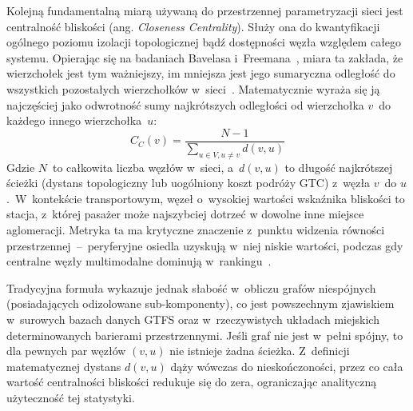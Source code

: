 \documentclass{pracamgr}
\begin{document}
Kolejną fundamentalną miarą używaną do przestrzennej parametryzacji sieci jest centralność bliskości (ang. \textit{Closeness Centrality}). Służy ona do kwantyfikacji ogólnego poziomu izolacji topologicznej bądź dostępności węzła względem całego systemu. Opierając się na badaniach Bavelasa i~Freemana~\cite{freeman}, miara ta zakłada, że wierzchołek jest tym ważniejszy, im mniejsza jest jego sumaryczna odległość do wszystkich pozostałych wierzchołków w~sieci~\cite{robustness, LUO2019102505}. Matematycznie wyraża się ją najczęściej jako odwrotność sumy najkrótszych odległości od wierzchołka $v$~do każdego innego wierzchołka~$u$:
$$C_C(v) = \frac{N-1}{\sum_{u \in V, u \neq v} d(v, u)}$$
Gdzie $N$~to całkowita liczba węzłów w~sieci, a~$d(v,u)$ to długość najkrótszej ścieżki (dystans topologiczny lub uogólniony koszt podróży GTC) z~węzła $v$~do $u$.~W~kontekście transportowym, węzeł o~wysokiej wartości wskaźnika bliskości to stacja, z~której pasażer może najszybciej dotrzeć w dowolne inne miejsce aglomeracji. Metryka ta ma krytyczne znaczenie z~punktu widzenia równości przestrzennej~–~peryferyjne osiedla uzyskują w~niej niskie wartości, podczas gdy centralne węzły multimodalne dominują w~rankingu~\cite{LUO2019102505, multilayer, turon_sierpinski_2019, Kozlak_Aleksandra_Znaczenie_2010}.

Tradycyjna formuła wykazuje jednak słabość w~obliczu grafów niespójnych (posiadających odizolowane sub-komponenty), co jest powszechnym zjawiskiem w~surowych bazach danych GTFS oraz w~rzeczywistych układach miejskich determinowanych barierami przestrzennymi. Jeśli graf nie jest w~pełni spójny, to dla pewnych par węzłów $(v, u)$ nie istnieje żadna ścieżka. Z~definicji matematycznej dystans $d(v, u)$ dąży wówczas do nieskończoności, przez co cała wartość centralności bliskości redukuje się do zera, ograniczając analityczną użyteczność tej statystyki.
\end{document}

